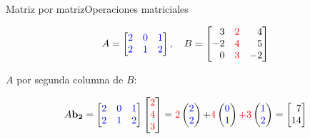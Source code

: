 \documentclass[spanish, c]{beamer}
\begin{document}
\begin{frame}{Matriz por matriz}{Operaciones matriciales}
    
    \[%
        A = %
        \begin{bmatrix*}[r]
            \color{blue} 2 & \color{blue} 0 & \color{blue} 1 \\
            \color{blue} 2 & \color{blue} 1 & \color{blue} 2
        \end{bmatrix*}, \quad
        B = %
        \begin{bmatrix*}[r]
            3 & \color{red} 2 & 4 \\
            -2 & \color{red} 4 & 5 \\
            0 & \color{red} 3 & -2
        \end{bmatrix*}
    \]

    \bigskip

    $A$ por segunda columna de $B$:

    \[A\mathbf{b_2} =
        \begin{bmatrix*}[r]
            \color{blue} 2 & \color{blue} 0 & \color{blue} 1 \\
            \color{blue} 2 & \color{blue} 1 & \color{blue} 2
        \end{bmatrix*}
        \begin{bmatrix*}[r]
            \color{red} 2 \\ \color{red} 4 \\ \color{red} 3
        \end{bmatrix*}
        = {\color{red} 2} %
        \begin{pmatrix*}[r]
            \color{blue} 2 \\ \color{blue} 2
        \end{pmatrix*}
        {+ \color{red} 4} %
        \begin{pmatrix*}[r]
            \color{blue} 0 \\ \color{blue} 1
        \end{pmatrix*}
        {\color{red} + 3} %
        \begin{pmatrix*}[r]
            \color{blue} 1 \\ \color{blue} 2
        \end{pmatrix*}
        = %
        \begin{bmatrix*}[r]
            7 \\ 14
        \end{bmatrix*}
    \]
\end{frame}
\end{document}
